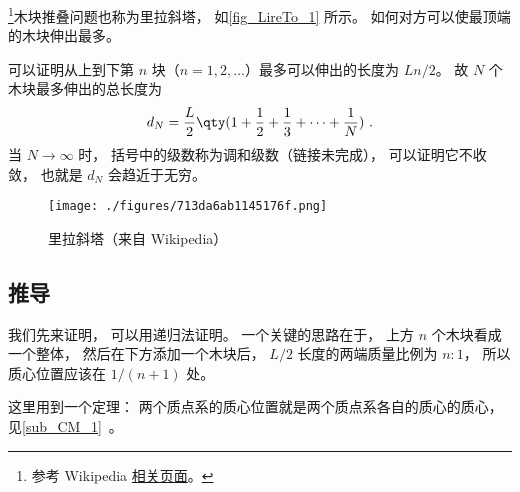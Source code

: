 
\begin{issues}
\issueDraft
\end{issues}


\footnote{参考 Wikipedia \href{https://en.wikipedia.org/wiki/Block-stacking_problem}{相关页面}。}木块推叠问题也称为里拉斜塔， 如\autoref{fig_LireTo_1} 所示。 如何对方可以使最顶端的木块伸出最多。

可以证明从上到下第 $n$ 块（$n=1,2,\dots$）最多可以伸出的长度为 $Ln/2$。 故 $N$ 个木块最多伸出的总长度为
\begin{equation}
d_N = \frac{L}{2}\qty(1 + \frac{1}{2} + \frac{1}{3} + \dots + \frac{1}{N})~.
\end{equation}
当 $N\to\infty$ 时， 括号中的级数称为调和级数（链接未完成）， 可以证明它不收敛， 也就是 $d_N$ 会趋近于无穷。

\begin{figure}[ht]
\centering
\texttt{[image: ./figures/713da6ab1145176f.png]}
\caption{里拉斜塔（来自 Wikipedia）} \label{fig_LireTo_1}
\end{figure}

\subsection{推导}
我们先来证明，   可以用递归法证明。  一个关键的思路在于， 上方 $n$ 个木块看成一个整体， 然后在下方添加一个木块后， $L/2$ 长度的两端质量比例为 $n:1$， 所以质心位置应该在 $1/(n+1)$ 处。

这里用到一个定理： 两个质点系的质心位置就是两个质点系各自的质心的质心， 见\autoref{sub_CM_1}~。



